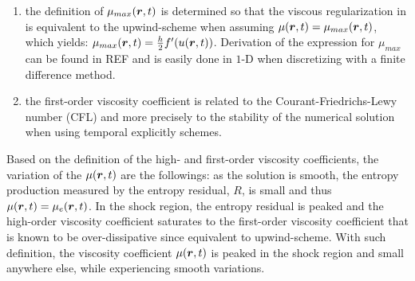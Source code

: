 \begin{enumerate}
\item the definition of $\mu_{max}(\boldsymbol r,t)$ is determined so that the viscous regularization in  is equivalent to the upwind-scheme when assuming $\mu(\boldsymbol r,t) = \mu_{max}(\boldsymbol r,t)$, which yields: $\mu_{max}(\boldsymbol r,t) = \frac{h}{2} f'(u(\boldsymbol r,t))$. Derivation of the expression for $\mu_{max}$ can be found in REF and is easily done in $1$-D when discretizing  with a finite difference method. 
\item the first-order viscosity coefficient is related to the Courant-Friedrichs-Lewy number (CFL) and more precisely to the stability of the numerical solution when using temporal explicitly schemes.
\end{enumerate}
Based on the definition of the high- and first-order viscosity coefficients, the variation of the $\mu(\boldsymbol r,t)$ are the followings: as the solution is smooth, the entropy production measured by the entropy residual, $R$, is small and thus $\mu(\boldsymbol r,t) = \mu_e(\boldsymbol r,t)$. In the shock region, the entropy residual is peaked and the high-order viscosity coefficient saturates to the first-order viscosity coefficient that is known to be over-dissipative since equivalent to upwind-scheme. With such definition, the viscosity coefficient $\mu(\boldsymbol r,t)$ is peaked in the shock region and small anywhere else, while experiencing smooth variations. 

